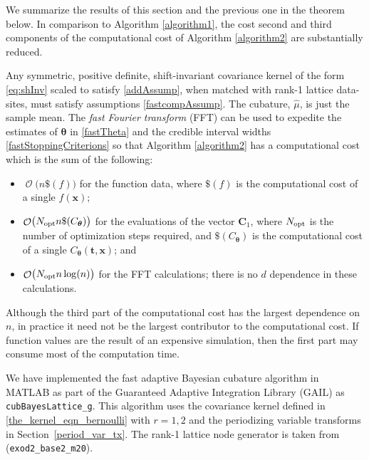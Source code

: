 \documentclass[twocolumn]{svjour3}          %
\DeclareMathOperator{\Order}{{\mathcal O}}
\newcommand{\bm}[1]{\boldsymbol{#1}}
\newcommand{\vtheta}{{\bm{\theta}}}
\newcommand{\vC}{\bm{C}}
\newcommand{\vt}{\bm{t}}
\newcommand{\vx}{\bm{x}}
\newcommand{\opt}{{\textup{opt}}}
\newcommand{\hmu}{\widehat{\mu}}
\newcommand{\code}[1]{\texttt{#1}}
\newcommand\secref{Section~\ref}
\begin{document}
We summarize the results of this section and the previous one in the theorem below.  In comparison to Algorithm \ref{algorithm1}, the cost second and third components of the computational cost of Algorithm  \ref{algorithm2} are substantially reduced.
\begin{theorem}
Any symmetric, positive definite,  shift-\break invariant covariance kernel of the form \eqref{eq:shInv} scaled to satisfy \eqref{addAssump}, when matched with rank-1 lattice data-sites, must satisfy assumptions \eqref{fastcompAssump}.  The cubature, $\hmu$, is just the sample mean.  The \emph{fast Fourier transform} (FFT) can be used to expedite the estimates of $\vtheta$ in \eqref{fastTheta} and the credible interval widths \eqref{fastStoppingCriterions} so that Algorithm \ref{algorithm2} has a computational cost which is the sum of the following:
\begin{itemize}
	\item $\Order\bigl(n\$(f) \bigr)$ for the function data, where $\$(f)$ is the computational cost of a single $f(\vx)$;
	
	\item $\Order\bigl(N_{\opt} n \$(C_\vtheta) \bigr)$ for the evaluations of the vector $\vC_{1}$, where $N_\opt$ is the number of optimization steps required, and  $\$(C_\vtheta)$ is the computational cost of a single $C_\vtheta(\vt,\vx)$; and
	
	\item $\Order\bigl(N_{\opt} n \log(n) \bigr)$ for the FFT calculations; there is no $d$ dependence in these calculations.
	
\end{itemize}

\end{theorem}

Although the third part of the computational cost has the largest dependence on $n$, in practice it need not be the largest contributor to the computational cost.  If function values are the result of an expensive simulation, then the first part may consume most of the computation time.

We have implemented the fast adaptive Bayesian cubature algorithm in MATLAB as part of the Guaranteed Adaptive Integration Library (GAIL) \cite{ChoEtal17b} as \allowbreak \code{cubBayesLattice\_g}. This algorithm uses the covariance kernel defined in  \eqref{the_kernel_eqn_bernoulli} with  $r=1,2$ and the periodizing variable transforms in  \secref{period_var_tx}.  The rank-1 lattice node generator is taken from \cite{Nuy17a} (\code{exod2\_base2\_m20}).
\end{document}
